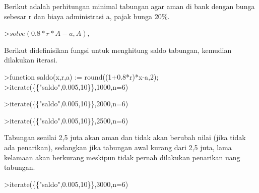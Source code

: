 \documentclass[a4paper,10pt]{article}
\begin{document}
\begin{eulernotebook}
\begin{eulercomment}
\begin{eulercomment}
\begin{eulercomment}
\begin{eulercomment}
\begin{eulercomment}
\begin{eulercomment}
\begin{eulercomment}
\begin{eulercomment}
\begin{eulercomment}
\begin{eulercomment}
\begin{eulercomment}
\begin{eulercomment}
\begin{eulercomment}
\begin{eulercomment}
\begin{eulercomment}
\begin{eulercomment}
\begin{eulercomment}
\begin{eulercomment}
\begin{eulercomment}
\begin{eulercomment}
\begin{eulercomment}
\begin{eulercomment}
\begin{eulercomment}
Berikut adalah perhitungan minimal tabungan agar aman di bank dengan bunga sebesar r dan
biaya administrasi a, pajak bunga 20\%.
\end{eulercomment}
\begin{eulerprompt}
>$solve(0.8*r*A-a,A), $%
\end{eulerprompt}
\begin{eulercomment}
Berikut didefinisikan fungsi untuk menghitung saldo tabungan, kemudian dilakukan iterasi.
\end{eulercomment}
\begin{eulerprompt}
>function saldo(x,r,a) := round((1+0.8*r)*x-a,2);
>iterate(\{\{"saldo",0.005,10\}\},1000,n=6)
\end{eulerprompt}
\begin{euleroutput}
  [1000,  994,  987.98,  981.93,  975.86,  969.76,  963.64]
\end{euleroutput}
\begin{eulerprompt}
>iterate(\{\{"saldo",0.005,10\}\},2000,n=6)
\end{eulerprompt}
\begin{euleroutput}
  [2000,  1998,  1995.99,  1993.97,  1991.95,  1989.92,  1987.88]
\end{euleroutput}
\begin{eulerprompt}
>iterate(\{\{"saldo",0.005,10\}\},2500,n=6)
\end{eulerprompt}
\begin{euleroutput}
  [2500,  2500,  2500,  2500,  2500,  2500,  2500]
\end{euleroutput}
\begin{eulercomment}
Tabungan senilai 2,5 juta akan aman dan tidak akan berubah nilai (jika tidak ada penarikan),
sedangkan jika tabungan awal kurang dari 2,5 juta, lama kelamaan akan berkurang meskipun
tidak pernah dilakukan penarikan uang tabungan.
\end{eulercomment}
\begin{eulerprompt}
>iterate(\{\{"saldo",0.005,10\}\},3000,n=6)
\end{eulerprompt}
\begin{euleroutput}
  [3000,  3002,  3004.01,  3006.03,  3008.05,  3010.08,  3012.12]
\end{euleroutput}
\begin{eulercomment}

\end{eulercomment}
\end{eulercomment}
\end{eulercomment}
\end{eulercomment}
\end{eulercomment}
\end{eulercomment}
\end{eulercomment}
\end{eulercomment}
\end{eulercomment}
\end{eulercomment}
\end{eulercomment}
\end{eulercomment}
\end{eulercomment}
\end{eulercomment}
\end{eulercomment}
\end{eulercomment}
\end{eulercomment}
\end{eulercomment}
\end{eulercomment}
\end{eulercomment}
\end{eulercomment}
\end{eulercomment}
\end{eulercomment}
\end{eulernotebook}
\end{document}
